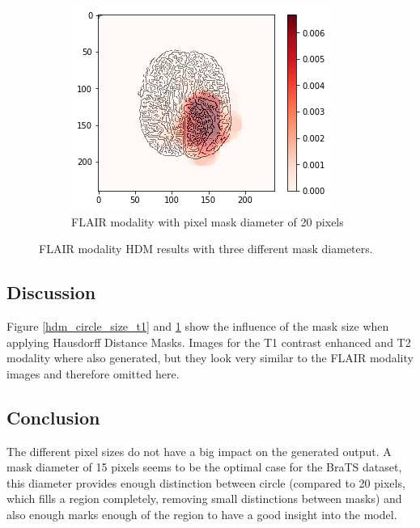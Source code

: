 \begin{figure}[H]
    \begin{subfigure}{.32\textwidth}
    \centering
        \includegraphics[width=\linewidth]{chapters/06_hdm/circle20/18.png}
        \caption{FLAIR modality with pixel mask diameter of 20 pixels}
    \end{subfigure}
    \caption{FLAIR modality HDM results with three different mask diameters.}
    \label{hdm_circle_size_flair}
\end{figure}

\subsection{Discussion}
Figure \ref{hdm_circle_size_t1} and \ref{hdm_circle_size_flair} show the influence of the mask size when applying Hausdorff Distance Masks.
Images for the T1 contrast enhanced and T2 modality where also generated, but they look very similar to the FLAIR modality images and therefore omitted here.

\subsection{Conclusion}
The different pixel sizes do not have a big impact on the generated output. A mask diameter of 15 pixels seems to be the optimal case for the BraTS dataset, this diameter
provides enough distinction between circle (compared to 20 pixels, which fills a region completely, removing small distinctions between masks) and also enough
marks enough of the region to have a good insight into the model.

